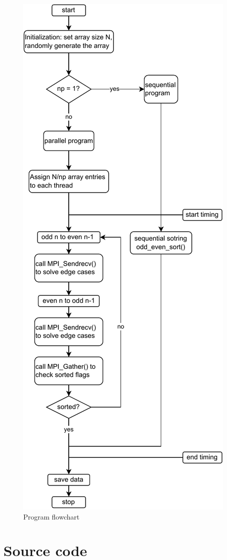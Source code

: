 \documentclass[twoside,12pt]{article}
\theoremstyle{definition}
\theoremstyle{remark}
\begin{document}
\newpage
\begin{figure}[H]
    \centering
    \includegraphics[height=0.95\textheight]{../flowchart_chopped.pdf}
    \caption{Program flowchart}
    \label{fig:flowchart}
\end{figure}

\newpage
\section{Source code}








\end{document}
